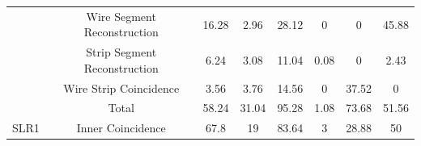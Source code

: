 \begin{table}[]
{\begin{tabular}{|c|c|c|c|c|c|c|c|}
                                                                                & Wire Segment Reconstruction  & 16.28                                                     & 2.96                                                      & 28.12                                                    & 0                                                                 & 0                                                      & 45.88                                                  \\ \cline{2-8} 
                                                                                & Strip Segment Reconstruction & 6.24                                                      & 3.08                                                      & 11.04                                                    & 0.08                                                              & 0                                                      & 2.43                                                   \\ \cline{2-8} 
                                                                                & Wire Strip Coincidence       & 3.56                                                      & 3.76                                                      & 14.56                                                    & 0                                                                 & 37.52                                                  & 0                                                      \\ \cline{2-8} 
                                                                                & Total                        & 58.24                                                     & 31.04                                                     & 95.28                                                    & 1.08                                                              & 73.68                                                  & 51.56                                                  \\ \hline\hline
    \multirow{3}{*}{SLR1}                                                       & Inner Coincidence            & 67.8                                                      & 19                                                        & 83.64                                                    & 3                                                                 & 28.88                                                  & 50                                                     \\ \cline{2-8} 

\end{tabular}}
\end{table}
